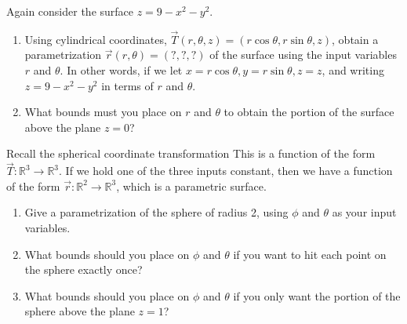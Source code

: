 \begin{problem}%
%
 Again consider the surface $z=9-x^2-y^2$.
\begin{enumerate}
 \item
Using cylindrical coordinates, $\vec T(r,\theta,z) = (r\cos \theta, r\sin\theta, z)$, obtain a parametrization $\vec r(r,\theta)=(?,?,?)$ of the surface using the input variables $r$ and $\theta$. In other words, if we let $x=r\cos \theta, y=r\sin\theta, z=z$, and writing $z=9-x^2-y^2$ in terms of $r$ and $\theta$.
 \item What bounds must you place on $r$ and $\theta$ to obtain the portion of the surface above the plane $z=0$?
\end{enumerate}

\end{problem}


\begin{problem}%
%

Recall the spherical coordinate transformation 
%
%
This is a function of the form $\vec T\colon \mathbb{R}^3\to\mathbb{R}^3$.  If we hold one of the three inputs constant, then we have a function of the form $\vec r\colon \mathbb{R}^2\to\mathbb{R}^3$, which is a parametric surface.
\begin{enumerate}
 \item {}%
Give a parametrization of the sphere of radius 2, using $\phi$ and $\theta$ as your input variables. 
 \item What bounds should you place on $\phi$ and $\theta$ if you want to hit each point on the sphere exactly once?
 \item What bounds should you place on $\phi$ and $\theta$ if you only want the portion of the sphere above the plane $z=1$?
\end{enumerate}
\end{problem}

